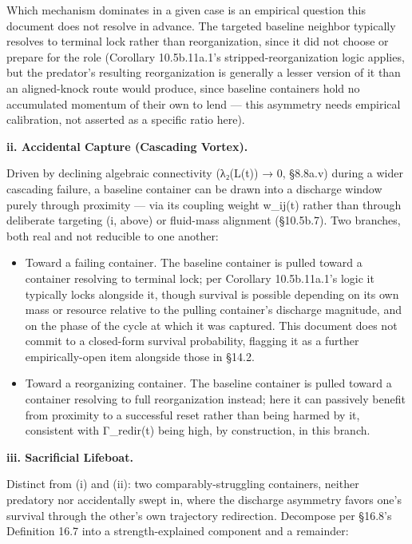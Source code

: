 \documentclass[
]{article}
\begin{document}
Which mechanism dominates in a given case is an empirical question this
document does not resolve in advance. The targeted baseline neighbor
typically resolves to terminal lock rather than reorganization, since it
did not choose or prepare for the role (Corollary 10.5b.11a.1's
stripped-reorganization logic applies, but the predator's resulting
reorganization is generally a lesser version of it than an aligned-knock
route would produce, since baseline containers hold no accumulated
momentum of their own to lend --- this asymmetry needs empirical
calibration, not asserted as a specific ratio here).

\textbf{ii. Accidental Capture (Cascading Vortex).}

Driven by declining algebraic connectivity (λ₂(L(t)) → 0, §8.8a.v)
during a wider cascading failure, a baseline container can be drawn into
a discharge window purely through proximity --- via its coupling weight
w\_ij(t) rather than through deliberate targeting (i, above) or
fluid-mass alignment (§10.5b.7). Two branches, both real and not
reducible to one another:

\begin{itemize}
\item
  Toward a failing container. The baseline container is pulled toward a
  container resolving to terminal lock; per Corollary 10.5b.11a.1's
  logic it typically locks alongside it, though survival is possible
  depending on its own mass or resource relative to the pulling
  container's discharge magnitude, and on the phase of the cycle at
  which it was captured. This document does not commit to a closed-form
  survival probability, flagging it as a further empirically-open item
  alongside those in §14.2.
\item
  Toward a reorganizing container. The baseline container is pulled
  toward a container resolving to full reorganization instead; here it
  can passively benefit from proximity to a successful reset rather than
  being harmed by it, consistent with Γ\_redir(t) being high, by
  construction, in this branch.
\end{itemize}

\textbf{iii. Sacrificial Lifeboat.}

Distinct from (i) and (ii): two comparably-struggling containers,
neither predatory nor accidentally swept in, where the discharge
asymmetry favors one's survival through the other's own trajectory
redirection. Decompose per §16.8's Definition 16.7 into a
strength-explained component and a remainder:
\end{document}
